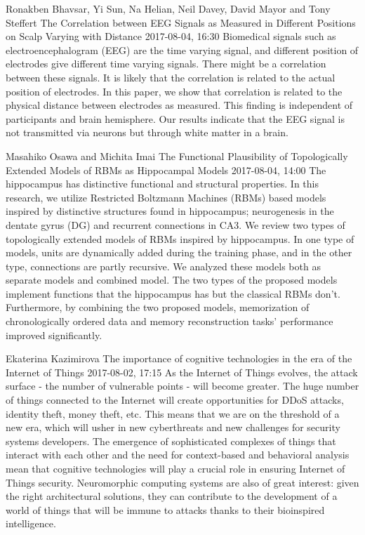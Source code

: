 \documentclass[10pt,fleqn,openany]{book} %
\begin{document}
\begin{enumerate}
		
		\paperabstract
		{Ronakben Bhavsar, Yi Sun, Na Helian, Neil Davey, David Mayor and Tony Steffert}
		{The Correlation between EEG Signals as Measured in Different Positions on Scalp Varying with Distance}
		{2017-08-04, 16:30}
		{Biomedical signals such as electroencephalogram (EEG) are the time varying signal, and different position of electrodes give different time varying signals. There might be a correlation between these signals. It is likely that the correlation is related to the actual position of electrodes. In this paper, we show that correlation is related to the physical distance between electrodes as measured. This finding is independent of participants and brain hemisphere. Our results indicate that the EEG signal is not transmitted via neurons but through white matter in a brain.}
		
		
		\paperabstract
		{Masahiko Osawa and Michita Imai}
		{The Functional Plausibility of Topologically Extended Models of RBMs as Hippocampal Models}
		{2017-08-04, 14:00}
		{The hippocampus has distinctive functional and structural properties. In this research, we utilize Restricted Boltzmann Machines (RBMs) based models inspired by distinctive structures found in hippocampus; neurogenesis in the dentate gyrus (DG) and recurrent connections in CA3. We review two types of topologically extended models of RBMs inspired by hippocampus. In one type of models, units are dynamically added during the training phase, and in the other type, connections are partly recursive. We analyzed these models both as separate models and combined model. The two types of the proposed models implement functions that the hippocampus has but the classical RBMs don't. Furthermore, by combining the two proposed models, memorization of chronologically ordered data and memory reconstruction tasks' performance improved significantly.}
		
		
		\paperabstract
		{Ekaterina Kazimirova}
		{The importance of cognitive technologies in the era of the Internet of Things}
		{2017-08-02, 17:15}
		{As the Internet of Things evolves, the attack surface - the number of vulnerable points - will become greater. The huge number of things connected to the Internet will create opportunities for DDoS attacks, identity theft, money theft, etc. This means that we are on the threshold of a new era, which will usher in new cyberthreats and new challenges for security systems developers. The emergence of sophisticated complexes of things that interact with each other and the need for context-based and behavioral analysis mean that cognitive technologies will play a crucial role in ensuring Internet of Things security. Neuromorphic computing systems are also of great interest: given the right architectural solutions, they can contribute to the development of a world of things that will be immune to attacks thanks to their bioinspired intelligence.}
		

\end{enumerate}
\end{document}
